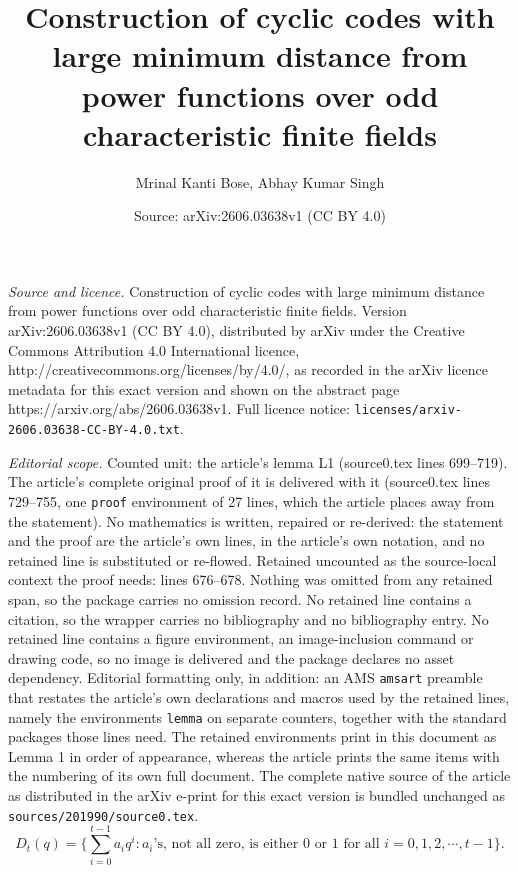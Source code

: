 \documentclass[10pt,a4paper]{amsart}
\title{Construction of cyclic codes with large minimum distance from power functions over odd characteristic finite fields}
\author{Mrinal Kanti Bose, Abhay Kumar Singh}
\date{Source: arXiv:2606.03638v1 (CC BY 4.0)}
\begin{document}
\maketitle

\noindent\emph{Source and licence.} Construction of cyclic codes with large minimum distance from power functions over odd characteristic finite fields. Version arXiv:2606.03638v1 (CC BY 4.0), distributed by arXiv under the Creative Commons Attribution 4.0 International licence, http://creativecommons.org/licenses/by/4.0/, as recorded in the arXiv licence metadata for this exact version and shown on the abstract page https://arxiv.org/abs/2606.03638v1. Full licence notice: \texttt{licenses/arxiv-2606.03638-CC-BY-4.0.txt}.\par\smallskip

\noindent\textit{Editorial scope.} Counted unit: the article's lemma L1 (source0.tex lines 699--719). The article's complete original proof of it is delivered with it (source0.tex lines 729--755, one \texttt{proof} environment of 27 lines, which the article places away from the statement). No mathematics is written, repaired or re-derived: the statement and the proof are the article's own lines, in the article's own notation, and no retained line is substituted or re-flowed.  Retained uncounted as the source-local context the proof needs: lines 676--678.  Nothing was omitted from any retained span, so the package carries no omission record.  No retained line contains a citation, so the wrapper carries no bibliography and no bibliography entry.  No retained line contains a figure environment, an image-inclusion command or drawing code, so no image is delivered and the package declares no asset dependency.  Editorial formatting only, in addition: an AMS \texttt{amsart} preamble that restates the article's own declarations and macros used by the retained lines, namely the environments \texttt{lemma} on separate counters, together with the standard packages those lines need.  The retained environments print in this document as Lemma 1 in order of appearance, whereas the article prints the same items with the numbering of its own full document.  The complete native source of the article as distributed in the arXiv e-print for this exact version is bundled unchanged as \texttt{sources/201990/source0.tex}.
\begin{equation}\label{Eq1}
    D_{t}(q)=\{\sum_{i=0}^{t-1}a_{i}q^{i}:a_{i}\text{'s, not all zero, is either $0$ or $1$ for all $i=0,1,2,\cdots,t-1$}\}.
\end{equation}
\end{document}
